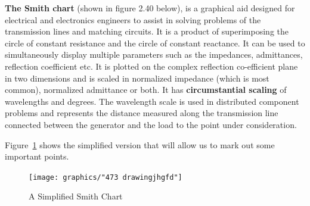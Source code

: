 \textbf{The Smith chart} (shown in figure 2.40 below), is a graphical aid designed for electrical and electronics engineers to assist in solving problems of the transmission lines and matching circuits. It is a product of superimposing the circle of constant resistance and the circle of constant reactance. It can be used to simultaneously display multiple parameters such as the impedances, admittances, reflection coefficient etc.
It is plotted on the complex reflection co-efficient plane in two dimensions and is scaled in normalized impedance (which is most common), normalized admittance or both. It has \textbf{circumstantial scaling} of wavelengths and degrees. The wavelength scale is used in distributed component problems and represents the distance measured along the transmission line connected between the generator and the load to the point under consideration.

Figure~\ref{fig:473-drawingjhgfd} shows the simplified version that will allow us to mark out some important points.
\begin{figure}[h]
\centering
\texttt{[image: graphics/"473 drawingjhgfd"]}
\caption{A Simplified Smith Chart}
\label{fig:473-drawingjhgfd}
\end{figure}

